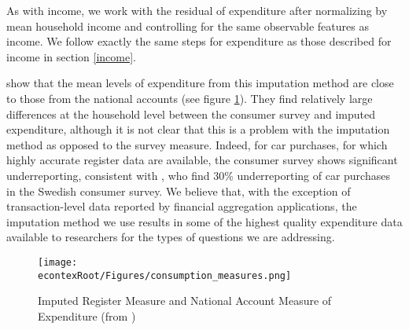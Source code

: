 \documentclass[titlepage]{\econtex}\newcommand{\texname}{ConsumptionHeterogeneity}
\begin{document}
	As with income, we work with the residual of expenditure after normalizing by mean household income and controlling for the same observable features as income. We follow exactly the same steps for expenditure as those described for income in section \ref{income}.
	
	\cite{abildgren_consistency_2018} show that the mean levels of expenditure from this imputation method are close to those from the national accounts (see figure \ref{fig:ConsumptionMeasures}). They find relatively large differences at the household level between the consumer survey and imputed expenditure, although it is not clear that this is a problem with the imputation method as opposed to the survey measure. Indeed, for car purchases, for which highly accurate register data are available, the consumer survey shows significant underreporting, consistent with \cite{koijen_judging_2014}, who find 30\% underreporting of car purchases in the Swedish consumer survey. We believe that, with the exception of transaction-level data reported by financial aggregation applications, the imputation method we use results in some of the highest quality expenditure data available to researchers for the types of questions we are addressing.
	\begin{figure} 
		\begin{centering}
			\texttt{[image: \\econtexRoot/Figures/consumption\_measures.png]} 
			\caption{Imputed Register Measure and National Account Measure of Expenditure (from \cite{abildgren_consistency_2018})}
			\label{fig:ConsumptionMeasures}
		\end{centering}
	\end{figure}
	
\end{document}
